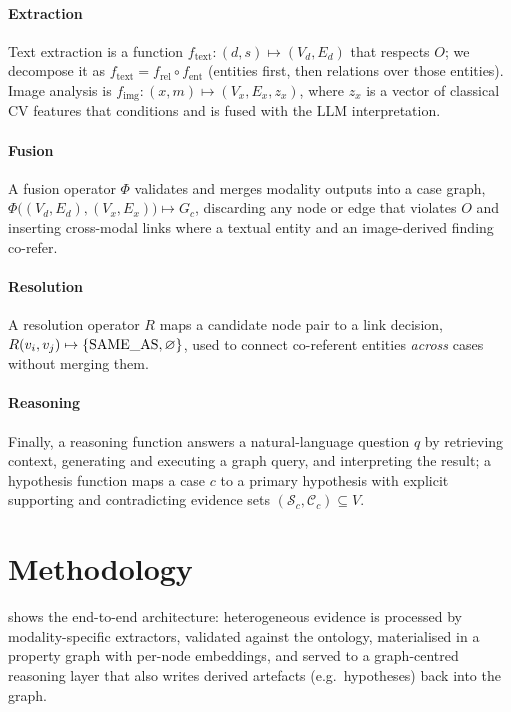 \documentclass[conference]{IEEEtran}
\newcommand{\rel}[1]{\textup{\MakeUppercase{#1}}}
\begin{document}
\paragraph*{Extraction} Text extraction is a function
$f_{\text{text}}:(d,s)\mapsto(V_d,E_d)$ that respects $O$; we decompose it as
$f_{\text{text}}=f_{\text{rel}}\circ f_{\text{ent}}$ (entities first, then
relations over those entities). Image analysis is
$f_{\text{img}}:(x,m)\mapsto(V_x,E_x,z_x)$, where $z_x$ is a vector of classical
CV features that conditions and is fused with the LLM interpretation.

\paragraph*{Fusion} A fusion operator $\Phi$ validates and merges modality
outputs into a case graph,
$\Phi\big((V_d,E_d),(V_x,E_x)\big)\mapsto G_c$, discarding any node or edge that
violates $O$ and inserting cross-modal links where a textual entity and an
image-derived finding co-refer.

\paragraph*{Resolution} A resolution operator $R$ maps a candidate node pair to a
link decision, $R(v_i,v_j)\mapsto\{\rel{same\_as},\varnothing\}$, used to connect
co-referent entities \emph{across} cases without merging them.

\paragraph*{Reasoning} Finally, a reasoning function answers a natural-language
question $q$ by retrieving context, generating and executing a graph query, and
interpreting the result; a hypothesis function maps a case $c$ to a primary
hypothesis with explicit supporting and contradicting evidence sets
$(\mathcal{S}_c,\mathcal{C}_c)\subseteq V$.

\section{Methodology}
\label{sec:method}

 shows the end-to-end architecture: heterogeneous evidence is
processed by modality-specific extractors, validated against the ontology,
materialised in a property graph with per-node embeddings, and served to a
graph-centred reasoning layer that also writes derived artefacts (e.g.\
hypotheses) back into the graph.
\end{document}
